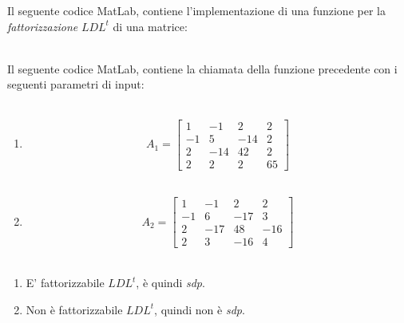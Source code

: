 Il seguente codice MatLab, contiene l'implementazione di una funzione per la \textit{fattorizzazione} $LDL^t$ di una matrice:\\\

Il seguente codice MatLab, contiene la chiamata della funzione precedente con i seguenti parametri di input:\\\
\begin{enumerate}
\item
\[
A_1 =\begin{bmatrix}
	1  & -1  & 2   & 2  \\ 
	-1 & 5   & -14 & 2  \\
	2  & -14 & 42  & 2  \\
	2  & 2   & 2   & 65 
\end{bmatrix}
\]\\
\item
\[
A_2 =\begin{bmatrix}
	1  & -1  & 2   & 2   \\ 
	-1 & 6   & -17 & 3   \\
	2  & -17 & 48  & -16 \\
	2  & 3   & -16 & 4   
\end{bmatrix}
\]\\

\end{enumerate}
\begin{enumerate}
\item
E' fattorizzabile $LDL^t$, è quindi \textit{sdp}.
\item
Non è fattorizzabile $LDL^t$, quindi non è \textit{sdp}.
\end{enumerate}